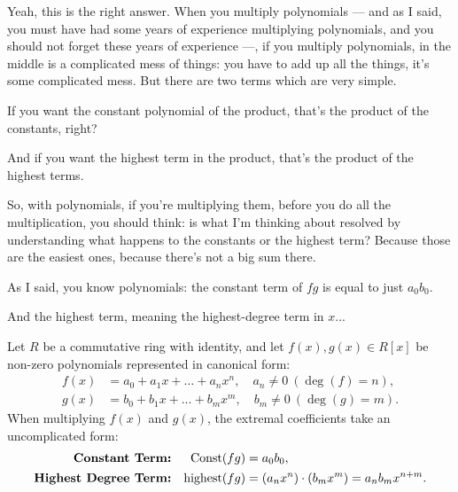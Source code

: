 \begin{speech}[00:20:45 - 00:22:05]
Yeah, this is the right answer. When you multiply polynomials --- and as I said, you must have had some years of experience multiplying polynomials, and you should not forget these years of experience ---, if you multiply polynomials, in the middle is a complicated mess of things: you have to add up all the things, it's some complicated mess. But there are two terms which are very simple.

If you want the constant polynomial of the product, that's the product of the constants, right? 

And if you want the highest term in the product, that's the product of the highest terms. 

So, with polynomials, if you're multiplying them, before you do all the multiplication, you should think: is what I'm thinking about resolved by understanding what happens to the constants or the highest term? Because those are the easiest ones, because there's not a big sum there.

As I said, you know polynomials: the constant term of $fg$ is equal to just $a_0 b_0$.

And the highest term, meaning the highest-degree term in $x$...
\end{speech}

\begin{content}
Let $R$ be a commutative ring with identity, and let $f(x), g(x) \in R[x]$ be non-zero polynomials represented in canonical form:
\begin{align}
    f(x) &= a_0 + a_1 x + \dots + a_n x^n, \quad a_n \neq 0 \ (\deg(f) = n), \label{eq:poly-f-rep} \\
    g(x) &= b_0 + b_1 x + \dots + b_m x^m, \quad b_m \neq 0 \ (\deg(g) = m). \label{eq:poly-g-rep}
\end{align}
When multiplying $f(x)$ and $g(x)$, the extremal coefficients take an uncomplicated form:
\begin{align}
    \text{\textbf{Constant Term:}} && \operatorname{Const}(fg) &= a_0 b_0, \label{eq:const-term-fg} \\
    \text{\textbf{Highest Degree Term:}} && \operatorname{highest}(fg) &= (a_n x^n) \cdot (b_m x^m) = a_n b_m x^{n+m}. \label{eq:highest-term-fg}
\end{align}
\end{content}

